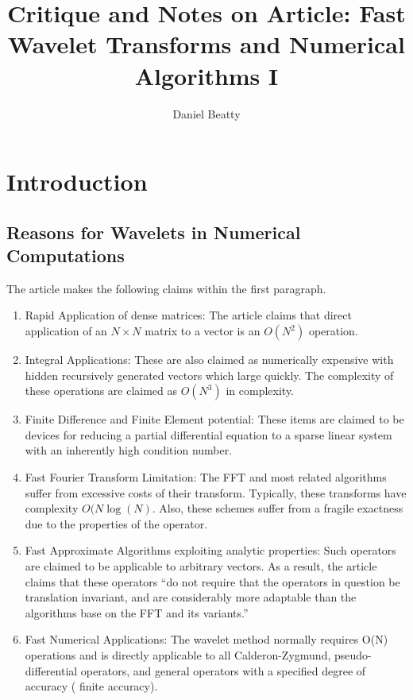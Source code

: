 \documentclass[11pt]{article}
\title{Critique and Notes on Article: Fast Wavelet Transforms and Numerical Algorithms I }
\author{Daniel Beatty}
\begin{document}
\maketitle

\section {Introduction} 
\subsection {Reasons for Wavelets in Numerical Computations}
The article makes the following claims within the first paragraph.  
\begin{enumerate}
\item Rapid Application of dense matrices:  The article claims that direct application of an $N \times N$ matrix to a vector is an $O(N^2)$ operation.
\item Integral Applications:  These are also claimed as numerically expensive with hidden recursively generated vectors which large quickly.  The complexity of these operations are claimed as $O(N^3)$ in complexity.  
\item Finite Difference and Finite Element potential: These items are claimed to be devices for reducing a partial differential equation to a sparse linear system with an inherently high condition number.  
\item Fast Fourier Transform Limitation:  The FFT and most related algorithms suffer from excessive costs of their transform.  Typically, these transforms have complexity $O(N \log (N)$.   Also, these schemes suffer from a fragile exactness due to the properties of the operator.  
\item Fast Approximate Algorithms exploiting analytic properties:  Such operators are claimed to be applicable to arbitrary vectors.  As a result, the article claims that these operators ``do not require that the operators in question be translation invariant, and are considerably more adaptable than the algorithms base on the FFT and its variants.''
\item Fast Numerical Applications: The wavelet method normally requires O(N) operations and is directly applicable to all Calderon-Zygmund,  pseudo-differential operators, and general operators with a specified degree of accuracy ( finite accuracy).  
\end{enumerate}
\end{document}
